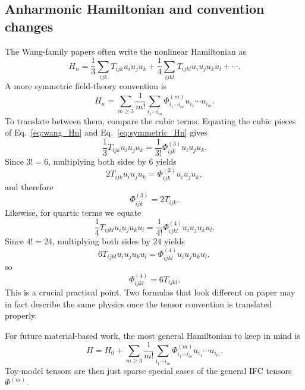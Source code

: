 \subsection{Anharmonic Hamiltonian and convention changes}
The Wang-family papers often write the nonlinear Hamiltonian as
\begin{equation}
    H_n = \frac{1}{3}\sum_{ijk}T_{ijk}u_i u_j u_k + \frac{1}{4}\sum_{ijkl}T_{ijkl}u_i u_j u_k u_l + \cdots.
    \label{eq:wang_Hn}
\end{equation}
A more symmetric field-theory convention is
\begin{equation}
    H_n = \sum_{m\ge 3}\frac{1}{m!}\sum_{i_1\cdots i_m}\Phi^{(m)}_{i_1\cdots i_m}u_{i_1}\cdots u_{i_m}.
    \label{eq:symmetric_Hn}
\end{equation}
To translate between them, compare the cubic terms. Equating the cubic pieces of Eq.~\eqref{eq:wang_Hn} and Eq.~\eqref{eq:symmetric_Hn} gives
\begin{equation}
    \frac{1}{3}T_{ijk}u_i u_j u_k = \frac{1}{3!}\Phi^{(3)}_{ijk}u_i u_j u_k.
\end{equation}
Since $3! = 6$, multiplying both sides by $6$ yields
\begin{equation}
    2T_{ijk}u_i u_j u_k = \Phi^{(3)}_{ijk}u_i u_j u_k,
\end{equation}
and therefore
\begin{equation}
    \Phi^{(3)}_{ijk} = 2T_{ijk}.
    \label{eq:phi3_vs_T3}
\end{equation}
Likewise, for quartic terms we equate
\begin{equation}
    \frac{1}{4}T_{ijkl}u_i u_j u_k u_l = \frac{1}{4!}\Phi^{(4)}_{ijkl}u_i u_j u_k u_l.
\end{equation}
Since $4! = 24$, multiplying both sides by $24$ yields
\begin{equation}
    6T_{ijkl}u_i u_j u_k u_l = \Phi^{(4)}_{ijkl}u_i u_j u_k u_l,
\end{equation}
so
\begin{equation}
    \Phi^{(4)}_{ijkl} = 6T_{ijkl}.
    \label{eq:phi4_vs_T4}
\end{equation}
This is a crucial practical point. Two formulas that look different on paper may in fact describe the same physics once the tensor convention is translated properly.

For future material-based work, the most general Hamiltonian to keep in mind is
\begin{equation}
    H = H_0 + \sum_{m\ge 3}\frac{1}{m!}\sum_{i_1\cdots i_m}\Phi^{(m)}_{i_1\cdots i_m}u_{i_1}\cdots u_{i_m}.
    \label{eq:general_hamiltonian}
\end{equation}
Toy-model tensors are then just sparse special cases of the general IFC tensors $\Phi^{(m)}$.

